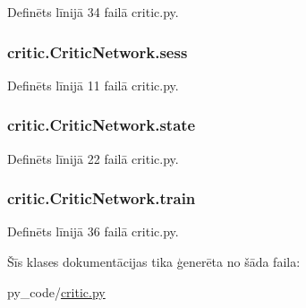 Definēts līnijā 34 failā critic.\+py.

\subsubsection[{\texorpdfstring{sess}{sess}}]{\setlength{\rightskip}{0pt plus 5cm}critic.\+Critic\+Network.\+sess}\hypertarget{classcritic_1_1_critic_network_ad19c4eb9fce11599a0807f94fcab6343}{}\label{classcritic_1_1_critic_network_ad19c4eb9fce11599a0807f94fcab6343}


Definēts līnijā 11 failā critic.\+py.

\subsubsection[{\texorpdfstring{state}{state}}]{\setlength{\rightskip}{0pt plus 5cm}critic.\+Critic\+Network.\+state}\hypertarget{classcritic_1_1_critic_network_a21da613cb1688ada3b416e4286649fc2}{}\label{classcritic_1_1_critic_network_a21da613cb1688ada3b416e4286649fc2}


Definēts līnijā 22 failā critic.\+py.

\subsubsection[{\texorpdfstring{train}{train}}]{\setlength{\rightskip}{0pt plus 5cm}critic.\+Critic\+Network.\+train}\hypertarget{classcritic_1_1_critic_network_a85b9d34191b5218ce6af960ec3846b4f}{}\label{classcritic_1_1_critic_network_a85b9d34191b5218ce6af960ec3846b4f}


Definēts līnijā 36 failā critic.\+py.



Šīs klases dokumentācijas tika ģenerēta no šāda faila\+:\begin{DoxyCompactItemize}
\item 
py\+\_\+code/\hyperlink{critic_8py}{critic.\+py}\end{DoxyCompactItemize}
